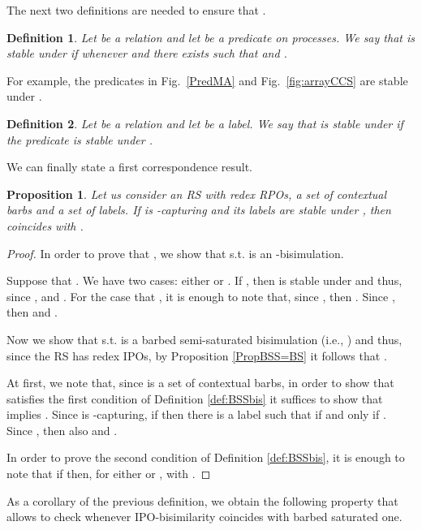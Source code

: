 \documentclass[copyright,creativecommons]{eptcs}
\newcommand{\<}{\langle}
\renewcommand{\>}{\rangle}
\newtheorem{definition}{Definition}{}
\newtheorem{proposition}{Proposition}{}
\begin{document}
The next two definitions are needed to ensure that .

\begin{definition}\label{def:PredStable}
Let  be a relation and let  be a
predicate on processes. We say that  is
\emph{stable under } if whenever  and
 there exists  such that  and .
\end{definition}

For example, the predicates in Fig.~\ref{PredMA} and
Fig.~\ref{fig:arrayCCS} are stable under .

\begin{definition}\label{def:Lstable}
Let  be a relation and let  be a label. We say
that  is \emph{stable under } if the predicate
 is stable under .
\end{definition}

We can finally state a first correspondence result.

\begin{proposition} \label{Prop:BSB=LB} Let us consider an RS with
  redex RPOs, a set  of contextual barbs and a set  of
  labels. If  is -capturing and its labels are stable under
  , then  coincides with .
\end{proposition}

\begin{proof}
In order to prove that , we show that
 s.t.  is an
-bisimulation.

Suppose that . We have two cases: either  or . If , then  is stable under
 and thus, since ,  and
. For the case that , it is enough to
note that, since , then . Since
, then  and .

Now we show that  s.t. 
is a barbed semi-saturated bisimulation (i.e., ) and thus, since the RS has redex IPOs, by
Proposition \ref{PropBSS=BS} it follows that .

At first, we note that, since  is a set of contextual barbs,
in order to show that  satisfies the first condition of
Definition \ref{def:BSSbis} it suffices to show that 
implies . Since  is -capturing,  if 
then there is a label  such that 
if and only if . Since , then also
 and .

In order to prove the second condition of Definition
\ref{def:BSSbis}, it is enough to note that if 
then, for either  or ,
 with .
\end{proof}

As a corollary of the previous definition, we obtain the following property
that allows to check whenever IPO-bisimilarity coincides with barbed
saturated one.
\end{document}
